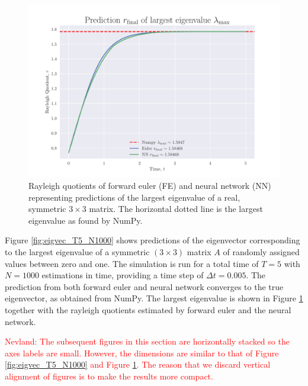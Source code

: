 \documentclass[12pt]{extarticle}
\begin{document}
\begin{figure}[h]
	\centering
	\includegraphics[scale=0.75]{../output/plots/eigval_T5_N1000.pdf}
	\caption{Rayleigh quotients of forward euler (FE) and neural network (NN) representing predictions of the largest eigenvalue of a real, symmetric $3\times 3$ matrix. The horizontal dotted line is the largest eigenvalue as found by NumPy.}
	\label{fig:eigval_T5_N1000}
\end{figure}

Figure \ref{fig:eigvec_T5_N1000} shows predictions of the eigenvector corresponding to the largest eigenvalue of a symmetric $(3\times 3)$ matrix $A$ of randomly assigned values between zero and one. The simulation is run for a total time of $T=5$ with $N=1000$ estimations in time, providing a time step of $\Delta t = 0.005$. The prediction from both forward euler and neural network converges to the true eigenvector, as obtained from NumPy. The largest eigenvalue is shown in Figure \ref{fig:eigval_T5_N1000} together with the rayleigh quotients estimated by forward euler and the neural network.

\textcolor{red}{Nevland: The subsequent figures in this section are horizontally stacked so the axes labels are small. However, the dimensions are similar to that of Figure \ref{fig:eigvec_T5_N1000} and Figure \ref{fig:eigval_T5_N1000}. The reason that we discard vertical alignment of figures is to make the results more compact.}
\end{document}
